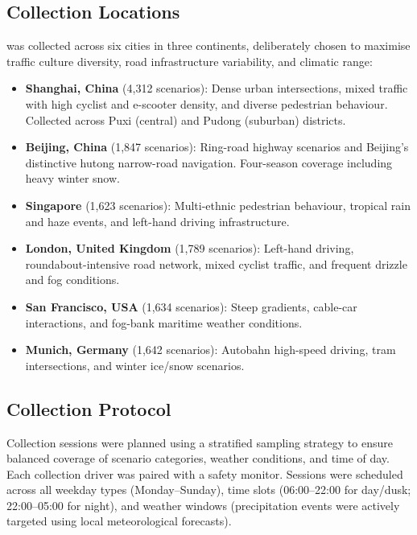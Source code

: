 \subsection{Collection Locations}
\label{ssec:collection_locations}

\lucid{} was collected across six cities in three continents, deliberately chosen to
maximise traffic culture diversity, road infrastructure variability, and climatic range:

\begin{itemize}[leftmargin=2em, noitemsep]
  \item \textbf{Shanghai, China} (4,312 scenarios): Dense urban intersections,
        mixed traffic with high cyclist and e-scooter density, and diverse pedestrian
        behaviour. Collected across Puxi (central) and Pudong (suburban) districts.
  \item \textbf{Beijing, China} (1,847 scenarios): Ring-road highway scenarios and
        Beijing's distinctive hutong narrow-road navigation. Four-season coverage
        including heavy winter snow.
  \item \textbf{Singapore} (1,623 scenarios): Multi-ethnic pedestrian behaviour,
        tropical rain and haze events, and left-hand driving infrastructure.
  \item \textbf{London, United Kingdom} (1,789 scenarios): Left-hand driving,
        roundabout-intensive road network, mixed cyclist traffic, and frequent
        drizzle and fog conditions.
  \item \textbf{San Francisco, USA} (1,634 scenarios): Steep gradients, cable-car
        interactions, and fog-bank maritime weather conditions.
  \item \textbf{Munich, Germany} (1,642 scenarios): Autobahn high-speed driving,
        tram intersections, and winter ice/snow scenarios.
\end{itemize}

\subsection{Collection Protocol}
\label{ssec:collection_protocol}

Collection sessions were planned using a stratified sampling strategy to ensure
balanced coverage of scenario categories, weather conditions, and time of day.
Each collection driver was paired with a safety monitor. Sessions were scheduled
across all weekday types (Monday--Sunday), time slots (06:00--22:00 for day/dusk;
22:00--05:00 for night), and weather windows (precipitation events were actively
targeted using local meteorological forecasts).


